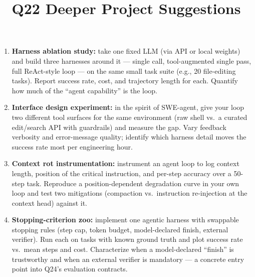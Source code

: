 \documentclass[11pt]{article}
\title{Q22 Deeper Project Suggestions}
\date{}
\begin{document}
\maketitle
\begin{enumerate}[noitemsep]
\item \textbf{Harness ablation study:} take one fixed LLM (via API or local weights) and build three harnesses around it --- single call, tool-augmented single pass, full ReAct-style loop --- on the same small task suite (e.g., 20 file-editing tasks). Report success rate, cost, and trajectory length for each. Quantify how much of the ``agent capability'' is the loop.
\item \textbf{Interface design experiment:} in the spirit of SWE-agent, give your loop two different tool surfaces for the same environment (raw shell vs.\ a curated edit/search API with guardrails) and measure the gap. Vary feedback verbosity and error-message quality; identify which harness detail moves the success rate most per engineering hour.
\item \textbf{Context rot instrumentation:} instrument an agent loop to log context length, position of the critical instruction, and per-step accuracy over a 50-step task. Reproduce a position-dependent degradation curve in your own loop and test two mitigations (compaction vs.\ instruction re-injection at the context head) against it.
\item \textbf{Stopping-criterion zoo:} implement one agentic harness with swappable stopping rules (step cap, token budget, model-declared finish, external verifier). Run each on tasks with known ground truth and plot success rate vs.\ mean steps and cost. Characterize when a model-declared ``finish'' is trustworthy and when an external verifier is mandatory --- a concrete entry point into Q24's evaluation contracts.
\end{enumerate}
\end{document}

